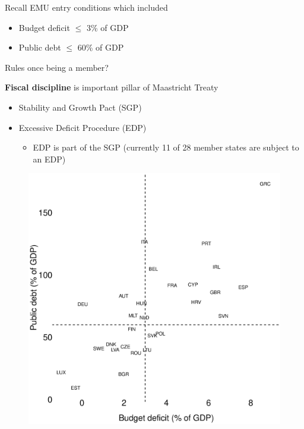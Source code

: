 \documentclass{beamer}
\begin{document}
\begin{frame} 
 Recall EMU entry conditions which included
\begin{itemize}
  \item Budget deficit $\leq$ 3\% of GDP
  \item Public debt $\leq$ 60\% of GDP
\end{itemize}
\medskip
Rules once being a member?
\end{frame}

\begin{frame}
  \textbf{Fiscal discipline} is important pillar of Maastricht Treaty
  \medskip
\begin{itemize}
  \item Stability and Growth Pact (SGP)
  \medskip
  \item Excessive Deficit Procedure (EDP)
  \begin{itemize}
    \item EDP is part of the SGP (currently 11 of 28 member states are subject to an EDP)
  \end{itemize}  
\end{itemize}
\end{frame}

\begin{frame}
  \begin{figure}
    \includegraphics[scale=.3]{fiscal_compliance.eps}
  \end{figure}
\end{frame}
\end{document}
